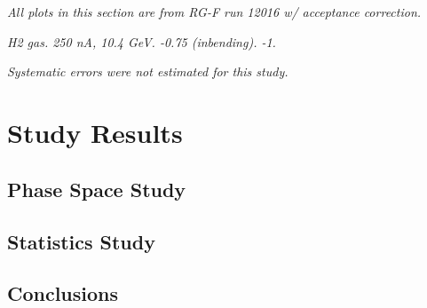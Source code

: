 \section*{}
\begin{frame}{}
    \label{12.00::study_results}
    \centering \Huge{}

    \vspace{9pt}

    \small{\textit{
        All plots in this section are from RG-F run 12016 w/ acceptance correction.
    }}

    \small{\textit{
         H2 gas.
         250 nA, 10.4 GeV.
         -0.75 (inbending).
         -1.
    }}

    \small{\textit{
        Systematic errors were not estimated for this study.
    }}
\end{frame}

\section{Study Results}
\subsection{Phase Space Study}


\subsection{Statistics Study}


\subsection{Conclusions}

